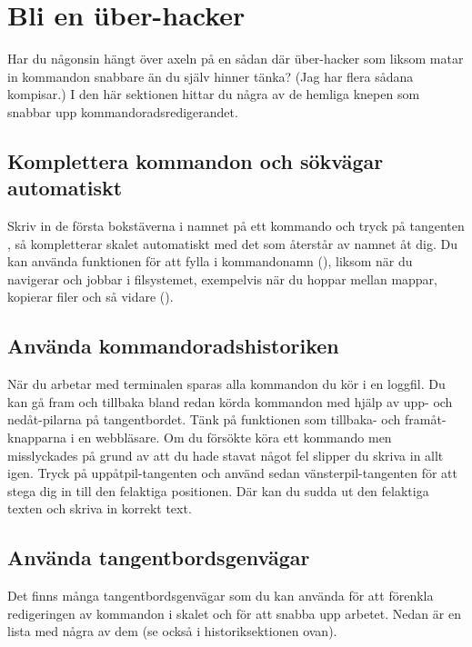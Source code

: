 \documentclass[a4paper,final]{memoir} %
\begin{document}
\section{Bli en über-hacker}

Har du någonsin hängt över axeln på en sådan där über-hacker som liksom matar in kommandon snabbare än du själv hinner tänka? (Jag har flera sådana kompisar.) I den här sektionen hittar du några av de hemliga knepen som snabbar upp kommandoradsredigerandet.

\subsection{Komplettera kommandon och sökvägar automatiskt}

Skriv in de första bokstäverna i namnet på ett kommando och tryck på tangenten , så kompletterar skalet automatiskt med det som återstår av namnet åt dig. Du kan använda funktionen för att fylla i kommandonamn (), liksom när du navigerar och jobbar i filsystemet, exempelvis när du hoppar mellan mappar, kopierar filer och så vidare ().

\subsection{Använda kommandoradshistoriken}

När du arbetar med terminalen sparas alla kommandon du kör i en loggfil. Du kan gå fram och tillbaka bland redan körda kommandon med hjälp av upp- och nedåt-pilarna på tangentbordet. Tänk på funktionen som tillbaka- och framåt-knapparna i en webbläsare. Om du försökte köra ett kommando men misslyckades på grund av att du hade stavat något fel slipper du skriva in allt igen. Tryck på uppåtpil-tangenten och använd sedan vänsterpil-tan\-gen\-ten för att stega dig in till den felaktiga positionen. Där kan du sudda ut den felaktiga texten och skriva in korrekt text. 

\subsection{Använda tangentbordsgenvägar}

Det finns många tangentbordsgenvägar som du kan använda för att förenkla redigeringen av kommandon i skalet och för att snabba upp arbetet. Nedan är en lista med några av dem (se också  i historiksektionen ovan).
\end{document}
